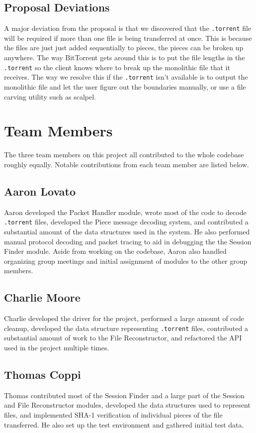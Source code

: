 \documentclass{acm_proc_article-sp}
\begin{document}
\subsection{Proposal Deviations}
A major deviation from the proposal is that we discovered that the
\texttt{.torrent} file will be required if more than one file is being
transferred at once.  This is because the files are just just added sequentially
to pieces, the pieces can be broken up anywhere.  The way BitTorrent gets around
this is to put the file lengths in the \texttt{.torrent} so the client knows
where to break up the monolithic file that it receives.  The way we resolve this
if the \texttt{.torrent} isn't available is to output the monolithic file and
let the user figure out the boundaries manually, or use a file carving utility
such as scalpel\cite{scalpel}.

\section{Team Members}
The three team members on this project all contributed to the whole codebase
roughly equally. Notable contributions from each team member are listed below.

\subsection{Aaron Lovato}
Aaron developed the Packet Handler module, wrote most of the code to decode
\texttt{.torrent} files, developed the Piece message decoding system, and
contributed a substantial amount of the data structures used in the system. He
also performed manual protocol decoding and packet tracing to aid in debugging
the the Session Finder module. Aside from working on the codebase, Aaron also
handled organizing group meetings and initial assignment of modules to the other
group members.

\subsection{Charlie Moore}
Charlie developed the driver for the project, performed a large amount of code
cleanup, developed the data structure representing \texttt{.torrent} files,
contributed a substantial amount of work to the File Reconstructor, and
refactored the API used in the project multiple times.

\subsection{Thomas Coppi}
Thomas contributed most of the Session Finder and a large part of the Session
and File Reconstructor modules, developed the data structures used to represent
files, and implemented SHA-1 verification of individual pieces of the file
transferred.  He also set up the test environment and gathered initial test
data.
\end{document}
